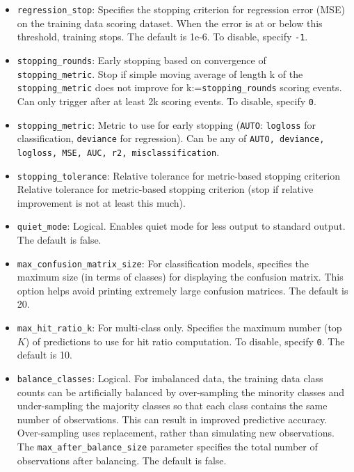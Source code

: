 {{\begin{itemize}
\item \texttt{regression\_stop}: Specifies the stopping criterion for regression error (MSE) on the training data scoring dataset. When the error is at or below this threshold, training stops. The default is 1e-6.  To disable, specify \texttt{-1}.

\item \texttt{stopping\_rounds}: Early stopping based on convergence of \\\texttt{stopping\_metric}. Stop if simple moving average of length k of the \texttt{stopping\_metric} does not improve for k:=\texttt{stopping\_rounds} scoring events. Can only trigger after at least 2k scoring events. To disable, specify \texttt{0}.

\item \texttt{stopping\_metric}: Metric to use for early stopping (\texttt{AUTO}: \texttt{logloss} for classification, \texttt{deviance} for regression). Can be any of \texttt{AUTO, deviance, logloss, MSE, AUC, r2, misclassification}.

\item \texttt{stopping\_tolerance}: Relative tolerance for metric-based stopping criterion Relative tolerance for metric-based stopping criterion (stop if relative improvement is not at least this much).

\item \texttt{quiet\_mode}: Logical. Enables quiet mode for less output to standard output. The default is false.

\item \texttt{max\_confusion\_matrix\_size}: For classification models, specifies the maximum size (in terms of classes) for displaying the confusion matrix. This option helps avoid printing extremely large confusion matrices. The default is 20.

\item \texttt{max\_hit\_ratio\_k}: For multi-class only. Specifies the maximum number (top $K$) of predictions to use for hit ratio computation. To disable, specify \texttt{0}. The default is 10.

\item \texttt{balance\_classes}: Logical. For imbalanced data, the training data class counts can be artificially balanced by over-sampling the minority classes and under-sampling the majority classes so that each class  contains the same number of observations.  This can result in improved predictive accuracy.  Over-sampling  uses replacement, rather than simulating new observations. The \texttt{max\_after\_balance\_size} parameter specifies the total number of observations after balancing. The default is false.


\end{itemize}}}
